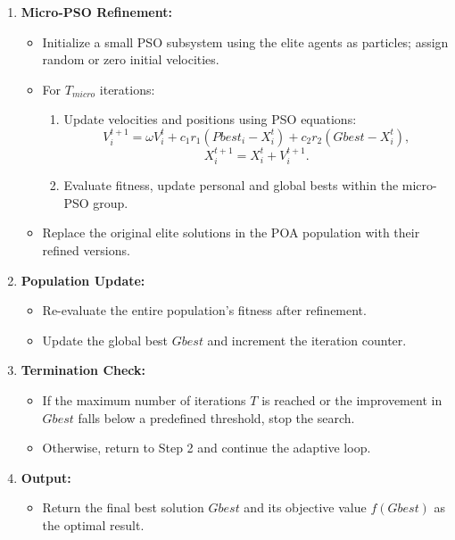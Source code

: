 \documentclass[a4paper,12pt]{article}
\begin{document}
\begin{enumerate}
    \item \textbf{Micro-PSO Refinement:}
    \begin{itemize}
        \item Initialize a small PSO subsystem using the elite agents as particles; assign random or zero initial velocities.
        \item For $T_{micro}$ iterations:
        \begin{enumerate}
            \item Update velocities and positions using PSO equations:
            \[
            V_i^{t+1} = \omega V_i^t + c_1 r_1 (Pbest_i - X_i^t) + c_2 r_2 (Gbest - X_i^t),
            \]
            \[
            X_i^{t+1} = X_i^t + V_i^{t+1}.
            \]
            \item Evaluate fitness, update personal and global bests within the micro-PSO group.
        \end{enumerate}
        \item Replace the original elite solutions in the POA population with their refined versions.
    \end{itemize}

    \item \textbf{Population Update:}
    \begin{itemize}
        \item Re-evaluate the entire population’s fitness after refinement.
        \item Update the global best $Gbest$ and increment the iteration counter.
    \end{itemize}

    \item \textbf{Termination Check:}
    \begin{itemize}
        \item If the maximum number of iterations $T$ is reached or the improvement in $Gbest$ falls below a predefined threshold, stop the search.
        \item Otherwise, return to Step 2 and continue the adaptive loop.
    \end{itemize}

    \item \textbf{Output:}
    \begin{itemize}
        \item Return the final best solution $Gbest$ and its objective value $f(Gbest)$ as the optimal result.
    \end{itemize}
\end{enumerate}
\end{document}
